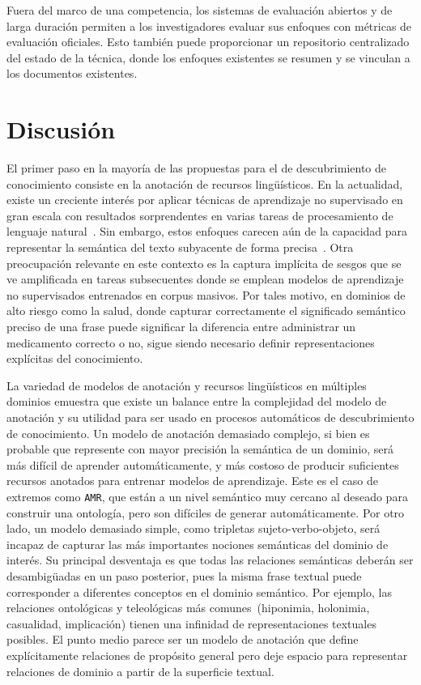 Fuera del marco de una competencia, los sistemas de evaluación abiertos y de larga duración permiten a los investigadores evaluar sus enfoques con métricas de evaluación oficiales.
Esto también puede proporcionar un repositorio centralizado del estado de la técnica, donde los enfoques existentes se resumen y se vinculan a los documentos existentes.

\section{Discusión}

El primer paso en la mayoría de las propuestas para el de descubrimiento de conocimiento consiste en la anotación de recursos lingüísticos.
En la actualidad, existe un creciente interés por aplicar técnicas de aprendizaje no supervisado en gran escala con resultados sorprendentes en varias tareas de procesamiento de lenguaje natural~\cite{floridi2020gpt}.
Sin embargo, estos enfoques carecen aún de la capacidad para representar la semántica del texto subyacente de forma precisa~\cite{bender2021dangers}.
Otra preocupación relevante en este contexto es la captura implícita de sesgos que se ve amplificada en tareas subsecuentes donde se emplean modelos de aprendizaje no supervisados entrenados en corpus masivos.
Por tales motivo, en dominios de alto riesgo como la salud, donde capturar correctamente el significado semántico preciso de una frase puede significar la diferencia entre administrar un medicamento correcto o no, sigue siendo necesario definir representaciones explícitas del conocimiento.

La variedad de modelos de anotación y recursos lingüísticos en múltiples dominios emuestra que existe un balance entre la complejidad del modelo de anotación y su utilidad para ser usado en procesos automáticos de descubrimiento de conocimiento.
Un modelo de anotación demasiado complejo, si bien es probable que represente con mayor precisión la semántica de un dominio, será más difícil de aprender automáticamente, y más costoso de producir suficientes recursos anotados para entrenar modelos de aprendizaje.
Este es el caso de extremos como \texttt{AMR}, que están a un nivel semántico muy cercano al deseado para construir una ontología, pero son difíciles de generar automáticamente.
Por otro lado, un modelo demasiado simple, como tripletas sujeto-verbo-objeto, será incapaz de capturar las más importantes nociones semánticas del dominio de interés.
Su principal desventaja es que todas las relaciones semánticas deberán ser desambigüadas en un paso posterior, pues la misma frase textual puede corresponder a diferentes conceptos en el dominio semántico.
Por ejemplo, las relaciones ontológicas y teleológicas más comunes~(hiponimia, holonimia, casualidad, implicación) tienen una infinidad de representaciones textuales posibles.
El punto medio parece ser un modelo de anotación que define explícitamente relaciones de propósito general pero deje espacio para representar relaciones de dominio a partir de la superficie textual.
